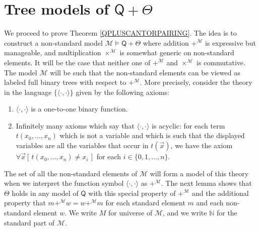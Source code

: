 \documentclass[10pt,a4paper, openany,  oldfontcommands]{memoir}
\newtheorem{open problem} [theorem] {Open Problem}
\newtheorem{open question} [theorem] {Open Question}
\begin{document}
\section{Tree models of  $  \mathsf{Q}  + \Theta$}



We proceed to prove Theorem  \ref{QPLUSCANTORPAIRING}. 
The idea  is   to construct a non-standard model    $  \mathcal{M}  \models   \mathsf{Q} + \Theta $ 
where   addition  $  +^{  \mathcal{M} }  $ is  expressive but manageable,  and   multiplication  $  \times^{  \mathcal{M} }  $  is somewhat generic  on non-standard elements. 
It will be the case that neither one of  $  +^{  \mathcal{M} }  $  and  $  \times^{  \mathcal{M} }  $   is commutative. 
The model  $  \mathcal{M} $  will be such that   the non-standard elements can be viewed as labeled  full binary trees with respect to     $+^{  \mathcal{M}  }  $. 
More precisely, consider the theory in the language $  \lbrace  \langle  \cdot ,  \cdot   \rangle   \rbrace $  given by the following  axioms: 
\begin{enumerate}
\item    $  \langle  \cdot ,  \cdot   \rangle   $  is a one-to-one  binary function.  




\item  Infinitely many axioms which say that   $   \langle \cdot , \cdot \rangle   $  is acyclic: 
for each  term   $ t (  x_0,  \ldots , x_n ) $ which is not  a variable  and which is  such that   the displayed variables are all the variables that occur in    $ t ( \vec{x} ) $, 
we have the axiom 
$  \forall  \vec{x} \left[  \,  t (  x_0,  \ldots , x_n )   \neq  x_i   \,   \right]  $  for each  $  i \in  \lbrace 0, 1,  \ldots , n  \rbrace  $.
\end{enumerate}
The set of all the non-standard elements of  $   \mathcal{M}   $  will  form a model of this theory when we interpret 
the function symbol  $  \langle  \cdot ,  \cdot   \rangle  $  as   $  +^{   \mathcal{M}   }   $. 
The next lemma shows that  $  \Theta  $  holds in  any model of  $   \mathsf{Q}   $  with this special  property of    $  +^{   \mathcal{M}  } $
and the additional property that 
 $  m  +^{  \mathcal{M}  }  w  =  w   +^{  \mathcal{M}  }   m  $ for each standard element $m $  and each non-standard element $w $. 
We write  $  M  $  for universe of  $  \mathcal{M}  $, and we write  $  \mathbb{N} $ for the standard part of   $  \mathcal{M}  $.
\end{document}

